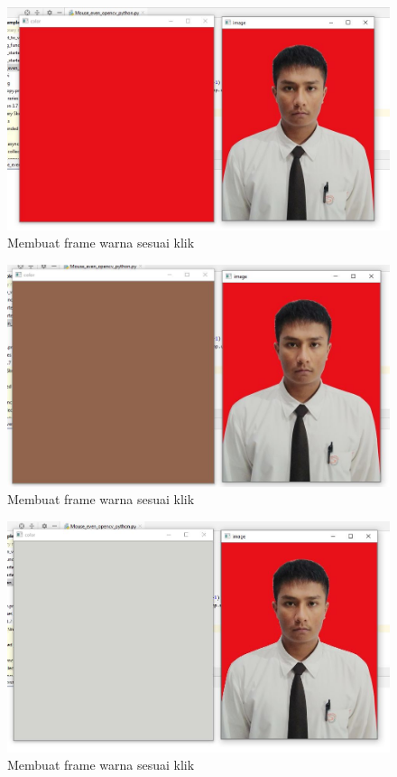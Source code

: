 \begin{figure}[ht]
\centering
\includegraphics[scale=0.4]{figures/2,24.jpg}
\caption{Membuat frame warna sesuai klik}
\label{contoh}
\end{figure}

\newpage
\begin{figure}[ht]
\centering
\includegraphics[scale=0.4]{figures/2,24,1.jpg}
\caption{Membuat frame warna sesuai klik}
\label{contoh}
\end{figure}

\begin{figure}[ht]
\centering
\includegraphics[scale=0.4]{figures/2,24,2.jpg}
\caption{Membuat frame warna sesuai klik}
\label{contoh}
\end{figure}



